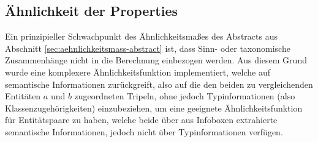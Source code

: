 \FloatBarrier
\subsection{Ähnlichkeit der Properties}\label{sec:aehnlichkeitsmass-properties}
Ein prinzipieller Schwachpunkt des Ähnlichkeitsmaßes des Abstracts aus Abschnitt \ref{sec:aehnlichkeitsmass-abstract} ist, dass Sinn- oder taxonomische Zusammenhänge nicht in die Berechnung einbezogen werden.
Aus diesem Grund wurde eine komplexere Ähnlichkeitsfunktion implementiert, welche auf semantische Informationen zurückgreift, also auf die den beiden zu vergleichenden Entitäten $a$ und $b$ zugeordneten Tripeln, ohne jedoch Typinformationen
(also Klassenzugehörigkeiten) einzubeziehen, um eine geeignete Ähnlichkeitsfunktion für Entitätspaare zu haben, welche beide über aus Infoboxen extrahierte semantische Informationen, jedoch nicht über Typinformationen verfügen.

